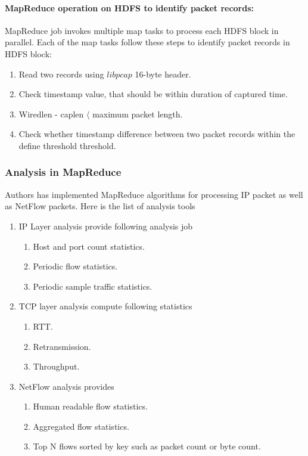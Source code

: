       \paragraph{MapReduce operation on HDFS to identify packet records:}
	MapReduce job invokes multiple map tasks to process each HDFS block in parallel. Each of the map tasks follow these steps to
	identify packet records in HDFS block:
	\begin{enumerate}
	 \item Read two records using $libpcap$ 16-byte header.
	 \item Check timestamp value, that should be within duration of captured time.
	 \item Wiredlen - caplen $\langle$ maximum packet length.
	 \item Check whether timestamp difference between two packet records within the define threshold threshold. 
	\end{enumerate}
	
	\subsubsection{Analysis in MapReduce}
	Authors has implemented  MapReduce algorithms for processing IP packet as well as NetFlow packets.
	Here is the list of analysis tools
	\begin{enumerate}
	 \item IP Layer analysis provide following analysis job
	      \begin{enumerate}
	       \item Host and port count statistics.
	       \item Periodic flow statistics.
	       \item Periodic sample traffic statistics.
	      \end{enumerate}
	 \item TCP layer analysis compute following statistics
	       \begin{enumerate}
	        \item RTT.
	        \item Retransmission.
	        \item Throughput.
	       \end{enumerate}
	\item NetFlow analysis provides 
	      \begin{enumerate}
	       \item Human readable flow statistics.
	       \item Aggregated flow statistics.
	       \item Top N flows sorted by key such as packet count or byte count. 
	      \end{enumerate}

	\end{enumerate}

